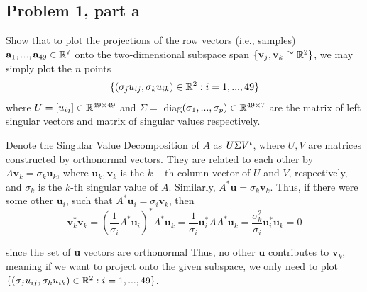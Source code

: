 \subsection{Problem 1, part a}
Show that to plot the projections of the row vectors (i.e., samples) $\textbf{a}_1, ..., \textbf{a}_{49} \in \mathbb{R}^{7}$ onto the two-dimensional subspace span $\{ \textbf{v}_j, \textbf{v}_k \cong \mathbb{R}^2\}$, we may simply plot the $n$ points 
\[
    \{(\sigma_ju_{ij}, \sigma_ku_{ik}) \in \mathbb{R}^2 : i = 1, ..., 49\}
\]
where $U = [u_{ij}] \in \mathbb{R}^{49\times 49}$ and $\Sigma = $ diag$(\sigma_1, ..., \sigma_p) \in \mathbb{R}^{49 \times 7}$ are the matrix of left singular vectors and matrix of singular values respectively.  

\partbreak
\begin{solution}

     Denote the Singular Value Decomposition of $A$ as $U\Sigma V^t$, where $U, V$ are matrices constructed by orthonormal vectors. They are related to each other by $A\textbf{v}_k = \sigma_k\textbf{u}_k$, where $\textbf{u}_k, \textbf{v}_k$ is the $k-$th column vector of $U$ and $V$, respectively, and $\sigma_k$ is the $k$-th singular value of $A$. Similarly, $A^*\textbf{u} = \sigma_k\textbf{v}_k$. Thus, if there were some other $\textbf{u}_i$, such that $A^*\textbf{u}_i = \sigma_i\textbf{v}_k$, then 
     \[
     \textbf{v}_k^*\textbf{v}_k = (\frac{1}{\sigma_i}A^*\textbf{u}_i)^*A^*\textbf{u}_k = \frac{1}{\sigma_i}\textbf{u}_i^*AA^*\textbf{u}_k = \frac{\sigma_k^2}{\sigma_i}\textbf{u}_i^*\textbf{u}_k = 0
     \]

      since the set of \textbf{u} vectors are orthonormal Thus, no other $\textbf{u}$ contributes to $\textbf{v}_k$, meaning if we want to project onto the given subspace, we only need to plot $\{(\sigma_ju_{ij}, \sigma_ku_{ik}) \in \mathbb{R}^2 : i = 1, ..., 49\}$.
\end{solution}

\newpage
